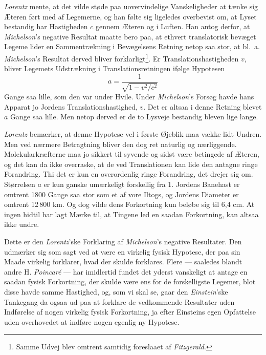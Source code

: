 \documentclass[12pt,a4paper]{article}
\newcommand{\opage}[1]{\marginnote{\footnotesize\textit{[#1]}}}
\begin{document}
\emph{Lorentz} mente, at det vilde støde paa uovervindelige Vanskeligheder at
tænke sig Æteren ført med af Legemerne, og han følte sig ligeledes overbevist
om, at Lyset bestandig har Hastigheden $c$ gennem Æteren og i Luften. Han
antog derfor, at \emph{Michelson}'s negative Resultat maatte bero paa, at
ethvert translatorisk bevæget Legeme lider en Sammentrækning i Bevægelsens
Retning netop saa stor, at bl.\ a. \emph{Michelson}'s Resultat derved bliver
forklarligt\footnote{Samme Udvej blev omtrent samtidig foreslaaet af
\emph{Fitzgerald}.}. Er Translationshastigheden $v$, bliver Legemets
Udstrækning i Translationsretningen ifølge Hypotesen
\[
  a = \frac{1}{\sqrt{1-v^{2}/c^{2}}}
\]
Gange saa lille, som den var under Hvile. Under \emph{Michelson}'s Forsøg
havde hans Apparat jo Jordens Translationshastighed, $v$. Det er altsaa i
denne Retning blevet $a$ Gange saa lille. Men netop derved er de to Lysveje
bestandig bleven lige lange.

\emph{Lorentz} bemærker, at denne Hypotese vel i første Øjeblik maa vække lidt
Undren. Men ved nærmere Betragtning bliver den dog ret naturlig og
nærliggende. Molekularkræfterne maa jo sikkert til syvende og sidst være
betingede af Æteren, og det kan da ikke overraske, at de ved Translationen kan
lide den antagne ringe Forandring. Thi det er kun en overordenlig ringe
Forandring, det drejer sig om. Størrelsen $a$ er kun ganske umærkeligt
forskellig fra 1. Jordens Banehast er omtrent 1800 Gange saa stor som et af
vore Iltogs, og Jordens Diameter er omtrent 12\,800 km. Og dog vilde dens
Forkortning kun beløbe sig til 6,4 cm. At ingen hidtil har lagt Mærke til, at
Tingene led en saadan Forkortning, kan altsaa ikke undre.

Dette er den \emph{Lorentz}'ske Forklaring af \emph{Michelson}'s negative
Resultater. Den udmærker sig som sagt ved at være en virkelig fysisk Hypotese,
der paa sin Maade virkelig forklarer, hvad der skulde forklares. Flere ---
saaledes blandt andre H. \emph{Poincaré} --- har imidlertid fundet det yderst
vanskeligt at antage en saadan fysisk Forkortning, der skulde være ens for de
forskelligste Legemer, blot
\opage{9} disse havde samme Hastighed, og, som vi skal se, gaar den \emph{Einstein}'ske
Tankegang da ogsaa ud paa at forklare de vedkommende Resultater uden
Indførelse af nogen virkelig fysisk Forkortning, ja efter Einsteins egen
Opfattelse uden overhovedet at indføre nogen egenlig ny Hypotese.
\end{document}
